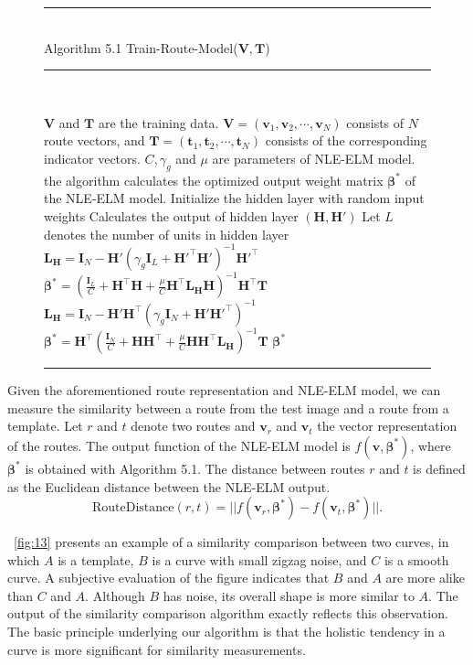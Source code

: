 \documentclass{article}
\newenvironment{myalgorithm}[1]%
{\begin{figure}[!h]\small\noindent\rule{\linewidth}{1pt}\\#1\vspace{-0.5em}\\%
\rule{\linewidth}{0.5pt}\\\vspace{-1.5em}}%
{\vspace{-0.5em}\rule{\linewidth}{1pt}\end{figure}}
\begin{document}
\begin{myalgorithm}{Algorithm 5.1 Train-Route-Model($\mathbf{V,T}$)}
\begin{algorithmic}[1]
\REQUIRE $\mathbf{V}$ and $\mathbf{T}$ are the training data.
$\mathbf{V}=(\mathbf{v}_1,\mathbf{v}_2,\cdots,\mathbf{v}_N)$
consists of $N$ route vectors, and $\mathbf{T}=(\mathbf{t}_1,\mathbf{t}_2,\cdots,\mathbf{t}_N)$
consists of the corresponding indicator vectors.
$C,\gamma_g$ and $\mu$ are parameters of NLE-ELM model.
\ENSURE the algorithm calculates the optimized output weight matrix $\mathbf\beta^{*}$
of the NLE-ELM model.
\STATE Initialize the hidden layer with random input weights
\STATE Calculates the output of hidden layer $(\mathbf{H,H'})$
\STATE Let $L$ denotes the number of units in hidden layer
  \STATE $\mathbf{L_H}=\mathbf{I}_N-\mathbf{H}'(\gamma_g\mathbf{I}_L+\mathbf{H'^\top H'})^{-1}\mathbf{H'^\top}$
  \STATE $\mathbf\beta^{*}=\left(\frac{\mathbf{I}_L}{C}+\mathbf{H^\top H}+\frac{\mu}{C}\mathbf{H^\top L_H H}\right)^{-1}\mathbf{H^\top T}$
\ELSE
  \STATE $\mathbf{L_H}=\mathbf{I}_N-\mathbf{H'H^\top}(\gamma_g\mathbf{I}_N+\mathbf{H'H'^\top})^{-1}$
  \STATE $\mathbf\beta^{*}=\mathbf{H^\top}\left(\frac{\mathbf{I}_N}{C}+\mathbf{HH^\top}+\frac{\mu}{C}\mathbf{HH^\top L_H}\right)^{-1}\mathbf{T}$
\ENDIF
\RETURN $\mathbf\beta^{*}$
\end{algorithmic}
\end{myalgorithm}

Given the aforementioned route representation and NLE-ELM model,
we can measure the similarity between a route from the test image and a route from a template.
Let $r$ and $t$ denote two routes and $\mathbf{v}_r$ and $\mathbf{v}_t$ the vector representation of the routes.
The output function of the NLE-ELM model is $f(\mathbf{v},\mathbf\beta^{*})$, 
where $\mathbf\beta^{*}$ is obtained with Algorithm 5.1.
The distance between routes $r$ and $t$ is defined as the Euclidean distance between the NLE-ELM output.
\begin{equation}
\mathrm{RouteDistance}(r,t)=||f(\mathbf{v}_r,\mathbf\beta^{*})-f(\mathbf{v}_t,\mathbf\beta^{*})||.
\end{equation}

\figurename~\ref{fig:13} presents an example of a similarity comparison between two curves,
in which $A$ is a template, $B$ is a curve with small zigzag noise, and $C$ is a smooth curve. 
A subjective evaluation of the figure indicates that $B$ and $A$ are more alike than $C$ and $A$. 
Although $B$ has noise, its overall shape is more similar to $A$. 
The output of the similarity comparison algorithm exactly reflects this observation. 
The basic principle underlying our algorithm is that the holistic tendency in a curve is more significant for similarity measurements. 
\end{document}
